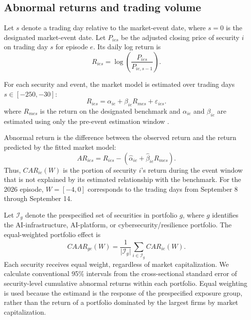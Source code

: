 \elsevierclasstrue\documentclass[preprint,12pt]{elsarticle}%
\begin{document}
\subsection{Abnormal returns and trading volume}

Let \(s\) denote a trading day relative to the market-event date, where \(s=0\) is the designated market-event date. Let \(P_{ies}\) be the adjusted closing price of security \(i\) on trading day \(s\) for episode \(e\). Its daily log return is
\begin{equation}
R_{ies}
=
\log\!\left(\frac{P_{ies}}{P_{ie,s-1}}\right).
\label{eq:return}
\end{equation}

For each security and event, the market model is estimated over trading days \(s\in[-250,-30]\):
\begin{equation}
R_{ies}
=
\alpha_{ie}
+
\beta_{ie}R_{mes}
+
\varepsilon_{ies}.
\label{eq:marketmodel}
\end{equation}
where \(R_{mes}\) is the return on the designated benchmark and \(\alpha_{ie}\) and \(\beta_{ie}\) are estimated using only the pre-event estimation window \citep{mackinlay1997event}.

Abnormal return is the difference between the observed return and the return predicted by the fitted market model:
\begin{equation}
AR_{ies}
=
R_{ies}
-
\left(
\widehat{\alpha}_{ie}
+
\widehat{\beta}_{ie}R_{mes}
\right).
\label{eq:ar}
\end{equation}
Thus, $CAR_{ie}(W)$ is the portion of security $i$'s return during the event window that is not explained by its estimated relationship with the benchmark. For the 2026 episode, $W=[-4,0]$ corresponds to the trading days from September 8 through September 14.

Let $\mathcal{I}_g$ denote the prespecified set of securities in portfolio $g$, where $g$ identifies the AI-infrastructure, AI-platform, or cybersecurity/resilience portfolio. The equal-weighted portfolio effect is
\begin{equation}
CAAR_{ge}(W)
  =\frac{1}{\lvert\mathcal{I}_g\rvert}
   \sum_{i\in\mathcal{I}_g}CAR_{ie}(W).
\label{eq:caar}
\end{equation}
Each security receives equal weight, regardless of market capitalization. We calculate conventional 95\% intervals from the cross-sectional standard error of security-level cumulative abnormal returns within each portfolio.
Equal weighting is used because the estimand is the response of the prespecified exposure group, rather than the return of a portfolio dominated by the largest firms by market capitalization.
\end{document}
